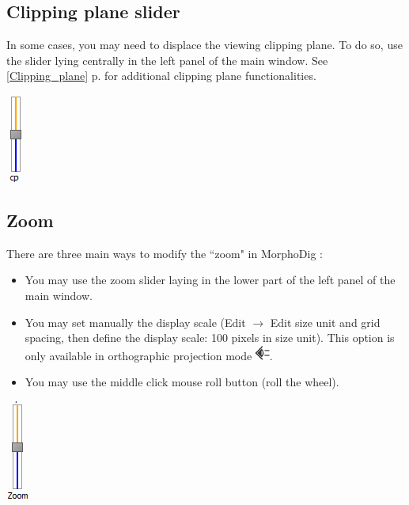 \subsection{Clipping plane slider}

\begin{minipage}{0.7\textwidth}
In some cases, you may need to displace the viewing clipping plane. To do so, use
the slider lying centrally in the left panel of the main window. See \ref{Clipping_plane} p.\pageref{Clipping_plane} for additional clipping plane functionalities.\\

\end{minipage}    
\begin{minipage}{0.25\textwidth}\centering
  \includegraphics[scale=0.5]{images/06/camera/cp_slider.png}
 \end{minipage}   




\subsection{Zoom}
There are three main ways to modify the ``zoom" in MorphoDig :


\begin{minipage}{0.7\textwidth}
\begin{itemize}
\item You may use the zoom slider laying in the lower part of the left panel of the main window.
\item	You may set manually the display scale (Edit $\rightarrow$  Edit size unit and grid spacing, then define the display scale: 100 pixels in size unit). This option is only available in orthographic projection mode \includegraphics[scale=0.7]{images/06/camera/camera_ortho.png}.
\item	You may use the middle click mouse roll button (roll the wheel).
\end{itemize}
\end{minipage}    
\begin{minipage}{0.25\textwidth}\centering
  \includegraphics[scale=0.5]{images/06/camera/zoom_slider.png}


 \end{minipage}    


